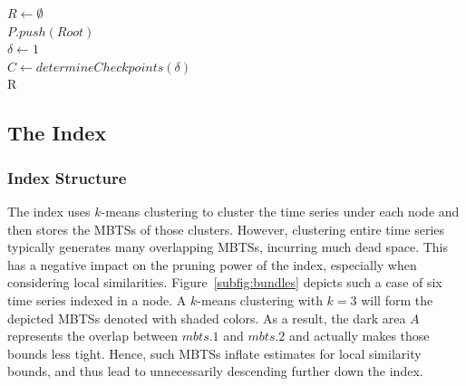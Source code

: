 \SetAlFnt{\small}
\begin{algorithm}[!t]
	\DontPrintSemicolon
	$R \leftarrow \emptyset$ \\
	$P.push(Root)$ \\
	$\delta \leftarrow 1$ \\
	$C \leftarrow determineCheckpoints(\delta)$ \\
	\KwRet R
	\caption{$Q_{rk}(T_q, k, \rho)$}
	\label{alg:query_ks}	
\end{algorithm}








\subsection{The \texorpdfstring{\sbtsr} IIndex}
\label{sec:sbtsr_index}

\subsubsection{Index Structure}
\label{subsec:structure_sbtsr}
The \btsr index uses $k$-means clustering to cluster the time series under each node and then stores the MBTSs of those clusters. However, clustering entire time series typically generates many overlapping MBTSs, incurring much dead space. This has a negative impact on the pruning power of the index, especially when considering local similarities. Figure~\ref{subfig:bundles} depicts such a case of six time series indexed in a node. A $k$-means clustering with $k=3$ will form the depicted MBTSs denoted with shaded colors. As a result, the dark area $A$ represents the overlap between $mbts.1$ and $mbts.2$ and actually makes those bounds less tight. Hence, such MBTSs inflate estimates for local similarity bounds, and thus lead to unnecessarily descending further down the index.

